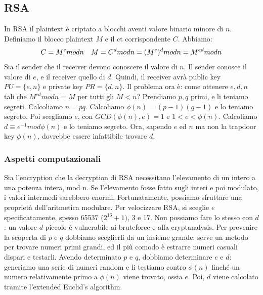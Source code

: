 \documentclass[11pt]{article}
\begin{document}
\subsection{RSA}
In RSA il plaintext è criptato a blocchi aventi valore binario minore di $n$. Definiamo il blocco plaintext $M$ e il ct corrispondente $C$. Abbiamo:
\begin{displaymath}
    C=M^e mod n \hspace{10px}M=C^d mod n = (M^e)^d mod n = M^{ed}mod n
\end{displaymath}
Sia il sender che il receiver devono conoscere il valore di $n$. Il sender conosce il valore di $e$, e il receiver quello di $d$. Quindi, il receiver avrà public key $PU=\{e,n\}$ e private key $PR=\{d,n\}$. Il problema ora è: come ottenere $e,d,n$ tali che $M^{ed} mod n = M$ per tutti gli $M<n$? Prendiamo $p,q$ primi, e li teniamo segreti. Calcoliamo $n=pq$. Calcoliamo $\phi(n) = (p-1)(q-1)$ e lo teniamo segreto.
Poi scegliamo $e$, con $GCD(\phi(n),e) = 1$ e $1<e<\phi(n)$. Calcoliamo $d \equiv e^{-1} mod \phi(n)$ e lo teniamo segreto. 
Ora, sapendo $e$ ed $n$ ma non la trapdoor key $\phi(n)$, dovrebbe essere infattibile trovare $d$.
\subsubsection{Aspetti computazionali}
Sia l'encryption che la decryption di RSA necessitano l'elevamento di un intero a una potenza intera, mod n. Se l'elevamento fosse fatto sugli interi e poi modulato, i valori intermedi sarebbero enormi. Fortunatamente, possiamo sfruttare una proprietà dell'aritmetica modulare.
Per velocizzare RSA, si sceglie $e$ specificatamente, spesso 65537 ($2^{16}+1)$, 3 e 17. Non possiamo fare lo stesso con $d$: un valore $d$ piccolo è vulnerabile ai bruteforce e alla cryptanalysis.
Per prevenire la scoperta di $p$ e $q$ dobbiamo sceglierli da un insieme grande: serve un metodo per trovare numeri primi grandi, ed il più comodo è estrarre numeri casuali dispari e testarli. 
Avendo determinato $p$ e $q$, dobbiamo determinare $e$ e $d$: generiamo una serie di numeri random e li testiamo contro $\phi(n)$ finché un numero relativamente primo a $\phi(n)$ viene trovato, ossia $e$. Poi, $d$ viene calcolato tramite l'extended Euclid's algorithm.
\end{document}
